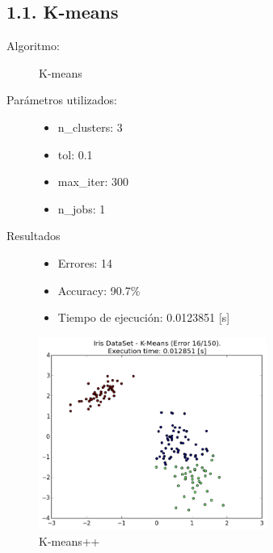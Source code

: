 \documentclass{article}
\begin{document}
\newpage

\subsection*{1.1. \; K-means}

\begin{description}
  \item[Algoritmo:] K-means
  \item[Parámetros utilizados:] \hfill
    \begin{itemize}
      \item n\_clusters: 3
      \item tol: 0.1
      \item max\_iter: 300
      \item n\_jobs: 1
    \end{itemize}
  \item[Resultados]\hfill
    \begin{itemize}
      \item Errores: 14
      \item Accuracy:  90.7\%
      \item Tiempo de ejecución: 0.0123851 [s]
    \end{itemize}
\end{description}

\begin{figure}[H]
  \centering
  \includegraphics[width=0.666\textwidth]{img/K-Means.png}
  \caption{K-means++}
\end{figure}
\newpage
\end{document}
